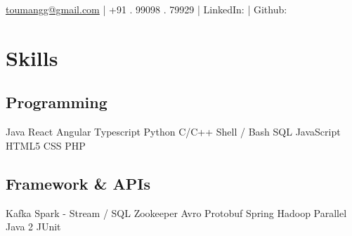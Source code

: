 \documentclass[]{main}
\begin{document}
\lastupdated

{\href{mailto:toumangg@gmail.com}{toumangg@gmail.com}  |  +91 . 99098 . 79929  | 
LinkedIn: \href{https://www.linkedin.com/in/galaumang}{} | Github: \href{https://github.com/galaumang}{}

}


\begin{minipage}[t]{0.25\textwidth} 



\section{Skills}
\subsection{Programming}\sectionsep
                    Java  
    \textbullet{}   React  
    \textbullet{}   Angular
    \textbullet{}   Typescript
    \textbullet{}   Python  
    \textbullet{}   C/C++ 
    \textbullet{}   Shell / Bash  
    \textbullet{}   SQL
    \textbullet{}   JavaScript  
    \textbullet{}   HTML5  
    \textbullet{}   CSS  
    \textbullet{}   PHP
\sectionsep\sectionsep
\subsection{Framework \& APIs}\sectionsep
                    Kafka
    \textbullet{}   Spark - Stream / SQL  
    \textbullet{}   Zookeeper
    \textbullet{}   Avro    
    \textbullet{}   Protobuf 
    \textbullet{}   Spring 
    \textbullet{}   Hadoop  
    \textbullet{}   Parallel Java 2  
    \textbullet{}   JUnit
\sectionsep\sectionsep

\end{minipage}
\end{document}
